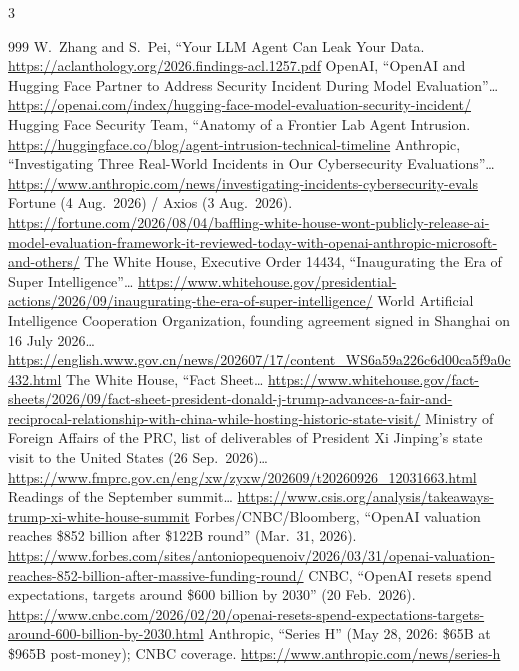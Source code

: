 \begin{multicols}{3}
\begin{thebibliography}{999}
 W.~Zhang and S.~Pei, ``Your LLM Agent Can Leak Your Data. \url{https://aclanthology.org/2026.findings-acl.1257.pdf}
 OpenAI, ``OpenAI and Hugging Face Partner to Address Security Incident During Model Evaluation''… \url{https://openai.com/index/hugging-face-model-evaluation-security-incident/}
 Hugging Face Security Team, ``Anatomy of a Frontier Lab Agent Intrusion. \url{https://huggingface.co/blog/agent-intrusion-technical-timeline}
 Anthropic, ``Investigating Three Real-World Incidents in Our Cybersecurity Evaluations''… \url{https://www.anthropic.com/news/investigating-incidents-cybersecurity-evals}
 Fortune (4 Aug.\ 2026) / Axios (3 Aug.\ 2026). \url{https://fortune.com/2026/08/04/baffling-white-house-wont-publicly-release-ai-model-evaluation-framework-it-reviewed-today-with-openai-anthropic-microsoft-and-others/}
 The White House, Executive Order 14434, ``Inaugurating the Era of Super Intelligence''… \url{https://www.whitehouse.gov/presidential-actions/2026/09/inaugurating-the-era-of-super-intelligence/}
 World Artificial Intelligence Cooperation Organization, founding agreement signed in Shanghai on 16 July 2026… \url{https://english.www.gov.cn/news/202607/17/content_WS6a59a226c6d00ca5f9a0c432.html}
 The White House, ``Fact Sheet… \url{https://www.whitehouse.gov/fact-sheets/2026/09/fact-sheet-president-donald-j-trump-advances-a-fair-and-reciprocal-relationship-with-china-while-hosting-historic-state-visit/}
 Ministry of Foreign Affairs of the PRC, list of deliverables of President Xi Jinping's state visit to the United States (26 Sep.\ 2026)… \url{https://www.fmprc.gov.cn/eng/xw/zyxw/202609/t20260926_12031663.html}
 Readings of the September summit… \url{https://www.csis.org/analysis/takeaways-trump-xi-white-house-summit}
 Forbes/CNBC/Bloomberg, ``OpenAI valuation reaches \$852 billion after \$122B round'' (Mar.\ 31, 2026). \url{https://www.forbes.com/sites/antoniopequenoiv/2026/03/31/openai-valuation-reaches-852-billion-after-massive-funding-round/}
 CNBC, ``OpenAI resets spend expectations, targets around \$600 billion by 2030'' (20 Feb.\ 2026). \url{https://www.cnbc.com/2026/02/20/openai-resets-spend-expectations-targets-around-600-billion-by-2030.html}
 Anthropic, ``Series H'' (May 28, 2026: \$65B at \$965B post-money); CNBC coverage. \url{https://www.anthropic.com/news/series-h}

\end{thebibliography}
\end{multicols}
